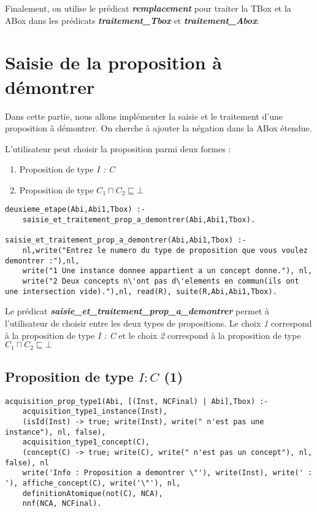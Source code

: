 \documentclass{rapportECL}
\begin{document}
Finalement, on utilise le prédicat \textbf{\textit{remplacement}} pour traiter la TBox et la ABox dans les prédicats \textbf{\textit{traitement\_Tbox}} et \textbf{\textit{traitement\_Abox}}. 

\newpage

\section{Saisie de la proposition à démontrer}

Dans cette partie, nous allons implémenter la saisie et le traitement d'une proposition à démontrer. On cherche à ajouter la négation dans la ABox étendue.

L'utilisateur peut choisir la proposition parmi deux formes :

\begin{enumerate}[label=-]
    \item Proposition de type \textit{I : C}
    \item Proposition de type \textit{\(C_1 \sqcap C_2 \sqsubseteq \bot\)}
\end{enumerate}

\begin{lstlisting}[style=prologStyle, caption={Saisie de la proposition}, label={saisie}]
deuxieme_etape(Abi,Abi1,Tbox) :-
    saisie_et_traitement_prop_a_demontrer(Abi,Abi1,Tbox).

saisie_et_traitement_prop_a_demontrer(Abi,Abi1,Tbox) :-
    nl,write("Entrez le numero du type de proposition que vous voulez demontrer :"),nl,
    write("1 Une instance donnee appartient a un concept donne."), nl,
    write("2 Deux concepts n\'ont pas d\'elements en commun(ils ont une intersection vide)."),nl, read(R), suite(R,Abi,Abi1,Tbox).
\end{lstlisting}

Le prédicat \textbf{\textit{saisie\_et\_traitement\_prop\_a\_demontrer}} permet à l'utilisateur de choisir entre les deux types de propositions. Le choix \textit{1} correspond à la proposition de type \textit{I : C} et le choix \textit{2} correspond à la proposition de type \textit{\(C_1 \sqcap C_2 \sqsubseteq \bot\)}

\subsection{Proposition de type \textit{\(I : C\)} (1)}

\begin{lstlisting}[style=prologStyle, caption={Traitement de la proposition de type 1}, label={prop1}]
acquisition_prop_type1(Abi, [(Inst, NCFinal) | Abi],Tbox) :-
    acquisition_type1_instance(Inst),
    (isId(Inst) -> true; write(Inst), write(" n'est pas une instance"), nl, false),
    acquisition_type1_concept(C),
    (concept(C) -> true; write(C), write(" n'est pas un concept"), nl, false), nl
    write('Info : Proposition a demontrer \"'), write(Inst), write(' : '), affiche_concept(C), write('\"'), nl,
    definitionAtomique(not(C), NCA),
    nnf(NCA, NCFinal).
\end{lstlisting}
\end{document}
